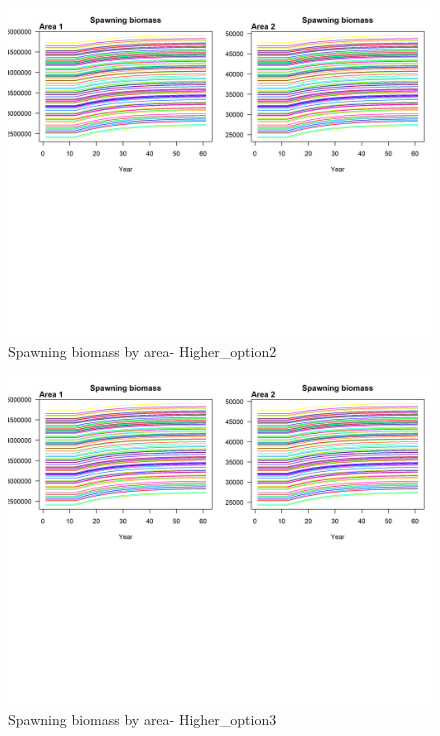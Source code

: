 \documentclass[
]{book}
\begin{document}
\begin{figure}
\includegraphics[width=1\linewidth]{data-test/Kole/Higher_option2_SB_Area} \caption{Spawning biomass by area- Higher_option2 }\label{fig:fig-SB-H-opt2}
\end{figure}

\begin{figure}
\includegraphics[width=1\linewidth]{data-test/Kole/Higher_option3_SB_Area} \caption{Spawning biomass by area- Higher_option3 }\label{fig:fig-SB-H-opt3}
\end{figure}
\end{document}
